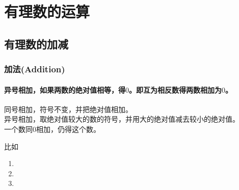\section{有理数的运算}
\subsection{有理数的加减}
\begin{frame}[t]
    \frametitle{加法(Addition)}
    \framesubtitle{异号相加，如果两数的绝对值相等，得$0$。即互为相反数得两数相加为$0$。}
    \begin{theorem}
        \alert<1>{同号相加}，符号不变，并把绝对值相加。\\
        \alert<2>{异号相加}，取绝对值较大的数的符号，并用大的绝对值减去较小的绝对值。\\
        一个数\alert<1>{同$0$相加}，仍得这个数。
    \end{theorem}
    \begin{block}{比如}
        \begin{enumerate}
            \item {}
            \item<2-| alert@2> 
            \item {}
        \end{enumerate}
    \end{block}
\end{frame}


